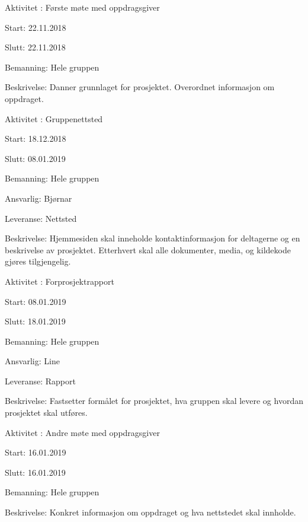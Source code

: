 \documentclass[11pt,a4paper]{report}
\begin{document}
\begin{compactdesc}
    \item [Aktivitet \arabic{aktivitetTeller}:] Første møte med oppdragsgiver
	\begin{compactitem}
	\item Start: 22.11.2018
	\item Slutt: 22.11.2018
	\item Bemanning: Hele gruppen
	\item Beskrivelse: Danner grunnlaget for prosjektet. Overordnet informasjon om oppdraget.
	\end{compactitem}
	\addtocounter{aktivitetTeller}{1}
	
	\item [Aktivitet \arabic{aktivitetTeller}:] Gruppenettsted
	\begin{compactitem} 
	\item Start: 18.12.2018
	\item Slutt: 08.01.2019
	\item Bemanning: Hele gruppen
	\item Ansvarlig: Bjørnar
	\item Leveranse: Nettsted
	\item Beskrivelse: Hjemmesiden skal inneholde kontaktinformasjon for deltagerne og en beskrivelse av prosjektet. Etterhvert skal alle dokumenter, media, og kildekode gjøres tilgjengelig.
	\addtocounter{aktivitetTeller}{1}
	\end{compactitem}
	
	\item [Aktivitet \arabic{aktivitetTeller}:] Forprosjektrapport
	\begin{compactitem}
	\item Start: 08.01.2019
	\item Slutt: 18.01.2019
	\item Bemanning: Hele gruppen
	\item Ansvarlig: Line
	\item Leveranse: Rapport
	\item Beskrivelse: Fastsetter formålet for prosjektet, hva gruppen skal levere og hvordan prosjektet skal utføres.
	\addtocounter{aktivitetTeller}{1}
	\end{compactitem}
	
	\item [Aktivitet \arabic{aktivitetTeller}:] Andre møte med oppdragsgiver
	\begin{compactitem}
	\item Start: 16.01.2019
	\item Slutt: 16.01.2019
	\item Bemanning: Hele gruppen
	\item Beskrivelse: Konkret informasjon om oppdraget og hva nettstedet skal innholde.
	\addtocounter{aktivitetTeller}{1}
	\end{compactitem}
	

\end{compactdesc}
\end{document}
